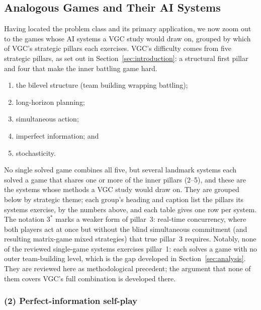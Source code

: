\clearpage
\subsection{Analogous Games and Their AI Systems}
\label{subsec:analogous}

Having located the problem class and its primary application, we now zoom out to
the games whose AI systems a VGC study would draw on, grouped by which of VGC's
strategic pillars each exercises. VGC's difficulty comes from five strategic
pillars, as set out in Section~\ref{sec:introduction}: a structural first pillar
and four that make the inner battling game hard.

\begin{enumerate}
  \item the bilevel structure (team building wrapping battling);
  \item long-horizon planning;
  \item simultaneous action;
  \item imperfect information; and
  \item stochasticity.
\end{enumerate}

No single solved game combines all five, but several landmark systems each solved
a game that shares one or more of the inner pillars (2--5), and these are the
systems whose methods a VGC study would draw on. They are grouped below by
strategic theme; each group's heading and caption list the pillars its systems
exercise, by the numbers above, and each table gives one row per system. The
notation $3^{*}$ marks a weaker form of pillar~3: real-time concurrency, where
both players act at once but without the blind simultaneous commitment (and
resulting matrix-game mixed strategies) that true pillar~3 requires. Notably,
none of the reviewed single-game systems exercises pillar~1: each solves a game
with no outer team-building level, which is the gap developed in
Section~\ref{sec:analysis}. They are reviewed here as methodological precedent;
the argument that none of them covers VGC's full combination is developed there.

\subsubsection{(2) Perfect-information self-play}
\label{subsubsec:analog_selfplay}

